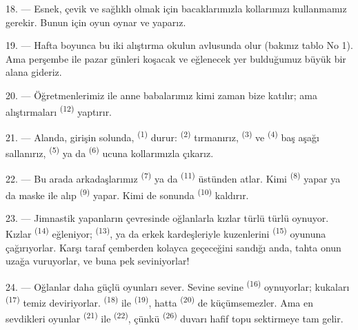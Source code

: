 18. --- Esnek, çevik ve sağlıklı olmak için bacaklarımızla kollarımızı
kullanmamız gerekir. Bunun için oyun oynar ve  yaparız.

19. --- Hafta boyunca bu iki alıştırma okulun avlusunda olur (bakınız tablo
No 1). Ama perşembe ile pazar günleri koşacak ve eğlenecek yer bulduğumuz büyük
bir alana gideriz.

20. --- Öğretmenlerimiz ile anne babalarımız kimi zaman bize katılır; ama
alıştırmaları  \textsuperscript{(12)} yaptırır.

21. --- Alanda, girişin solunda, 
\textsuperscript{(1)} durur:  \textsuperscript{(2)}
tırmanırız,  \textsuperscript{(3)} ve 
\textsuperscript{(4)} baş aşağı sallanırız, 
\textsuperscript{(5)} ya da  \textsuperscript{(6)} ucuna
kollarımızla çıkarız.

22. --- Bu arada arkadaşlarımız  \textsuperscript{(7)} ya
da  \textsuperscript{(11)} üstünden atlar. Kimi
 \textsuperscript{(8)} yapar ya da maske ile 
alıp  \textsuperscript{(9)} yapar. Kimi de sonunda
 \textsuperscript{(10)} kaldırır.

\VUsaut{4.6mm}
\VUsaut{3.0mm}

23. --- Jimnastik yapanların çevresinde oğlanlarla kızlar türlü türlü
 oynuyor. Kızlar  \textsuperscript{(14)}
eğleniyor;  \textsuperscript{(13)}, ya da erkek
kardeşleriyle kuzenlerini  \textsuperscript{(15)} oyununa
çağırıyorlar. Karşı taraf çemberden kolayca geçeceğini sandığı anda, tahta
 onun  uzağa vuruyorlar, ve buna pek
seviniyorlar!

24. --- Oğlanlar daha güçlü oyunları sever. Sevine sevine 
\textsuperscript{(16)} oynuyorlar; kukaları 
\textsuperscript{(17)} temiz deviriyorlar. 
\textsuperscript{(18)} ile  \textsuperscript{(19)}, hatta
 \textsuperscript{(20)} de küçümsemezler. Ama en
sevdikleri oyunlar  \textsuperscript{(21)} ile  \textsuperscript{(22)}, çünkü 
\textsuperscript{(26)} duvarı hafif topu sektirmeye tam gelir.


